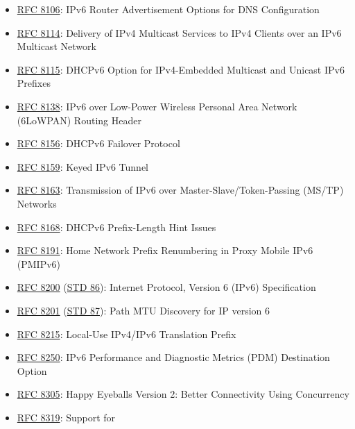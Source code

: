 \documentclass[
]{article}
\begin{document}
\begin{itemize}
  \href{https://www.rfc-editor.org/info/rfc8105}{RFC 8105}: Transmission
  of IPv6 Packets over Digital Enhanced Cordless Telecommunications
  (DECT) Ultra Low Energy (ULE)
\item
  \href{https://www.rfc-editor.org/info/rfc8106}{RFC 8106}: IPv6 Router
  Advertisement Options for DNS Configuration
\item
  \href{https://www.rfc-editor.org/info/rfc8114}{RFC 8114}: Delivery of
  IPv4 Multicast Services to IPv4 Clients over an IPv6 Multicast Network
\item
  \href{https://www.rfc-editor.org/info/rfc8115}{RFC 8115}: DHCPv6
  Option for IPv4-Embedded Multicast and Unicast IPv6 Prefixes
\item
  \href{https://www.rfc-editor.org/info/rfc8138}{RFC 8138}: IPv6 over
  Low-Power Wireless Personal Area Network (6LoWPAN) Routing Header
\item
  \href{https://www.rfc-editor.org/info/rfc8156}{RFC 8156}: DHCPv6
  Failover Protocol
\item
  \href{https://www.rfc-editor.org/info/rfc8159}{RFC 8159}: Keyed IPv6
  Tunnel
\item
  \href{https://www.rfc-editor.org/info/rfc8163}{RFC 8163}: Transmission
  of IPv6 over Master-Slave/Token-Passing (MS/TP) Networks
\item
  \href{https://www.rfc-editor.org/info/rfc8168}{RFC 8168}: DHCPv6
  Prefix-Length Hint Issues
\item
  \href{https://www.rfc-editor.org/info/rfc8191}{RFC 8191}: Home Network
  Prefix Renumbering in Proxy Mobile IPv6 (PMIPv6)
\item
  \href{https://www.rfc-editor.org/info/rfc8200}{RFC 8200}
  (\href{https://www.rfc-editor.org/info/std86}{STD 86}): Internet
  Protocol, Version 6 (IPv6) Specification
\item
  \href{https://www.rfc-editor.org/info/rfc8201}{RFC 8201}
  (\href{https://www.rfc-editor.org/info/std87}{STD 87}): Path MTU
  Discovery for IP version 6
\item
  \href{https://www.rfc-editor.org/info/rfc8215}{RFC 8215}: Local-Use
  IPv4/IPv6 Translation Prefix
\item
  \href{https://www.rfc-editor.org/info/rfc8250}{RFC 8250}: IPv6
  Performance and Diagnostic Metrics (PDM) Destination Option
\item
  \href{https://www.rfc-editor.org/info/rfc8305}{RFC 8305}: Happy
  Eyeballs Version 2: Better Connectivity Using Concurrency
\item
  \href{https://www.rfc-editor.org/info/rfc8319}{RFC 8319}: Support for

\end{itemize}
\end{document}
